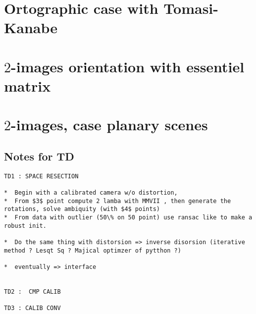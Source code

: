 \section{Ortographic case with Tomasi-Kanabe}


\section{$2$-images orientation with essentiel matrix}


\section{$2$-images, case planary scenes}



\subsection{Notes for TD}


\begin{verbatim}
TD1 : SPACE RESECTION

*  Begin with a calibrated camera w/o distortion,
*  From $3$ point compute 2 lamba with MMVII , then generate the rotations, solve ambiquity (with $4$ points)
*  From data with outlier (50\% on 50 point) use ransac like to make a robust init.

*  Do the same thing with distorsion => inverse disorsion (iterative method ? Lesqt Sq ? Majical optimzer of pytthon ?)

*  eventually => interface


TD2 :  CMP CALIB

TD3 : CALIB CONV
\end{verbatim}




